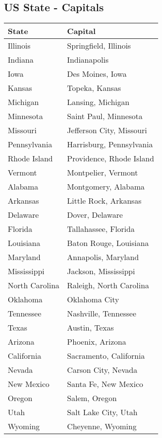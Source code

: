\documentclass[10pt,11pt,12pt,oneside]{book}
\begin{document}
\begin{appendices}
\subsection{US State - Capitals}
\begin{table}[H]
	\begin{center}
		\begin{tabular}{|p{3in}|p{3in}|} \hline 
			State & Capital \\ \hline 
			Illinois & Springfield, Illinois \\ \hline 
			Indiana & Indianapolis \\ \hline 
			Iowa & Des Moines, Iowa \\ \hline 
			Kansas & Topeka, Kansas \\ \hline 
			Michigan & Lansing, Michigan \\ \hline 
			Minnesota & Saint Paul, Minnesota \\ \hline 
			Missouri & Jefferson City, Missouri \\ \hline 
			Pennsylvania & Harrisburg, Pennsylvania \\ \hline 
			Rhode Island & Providence, Rhode Island \\ \hline 
			Vermont & Montpelier, Vermont \\ \hline 
			Alabama & Montgomery, Alabama \\ \hline 
			Arkansas & Little Rock, Arkansas \\ \hline 
			Delaware & Dover, Delaware \\ \hline 
			Florida & Tallahassee, Florida \\ \hline 
			Louisiana & Baton Rouge, Louisiana \\ \hline 
			Maryland & Annapolis, Maryland \\ \hline 
			Mississippi & Jackson, Mississippi \\ \hline 
			North Carolina & Raleigh, North Carolina \\ \hline 
			Oklahoma & Oklahoma City \\ \hline 
			Tennessee & Nashville, Tennessee \\ \hline 
			Texas & Austin, Texas \\ \hline 
			Arizona & Phoenix, Arizona \\ \hline 
			California & Sacramento, California \\ \hline 
			Nevada & Carson City, Nevada \\ \hline 
			New Mexico & Santa Fe, New Mexico \\ \hline 
			Oregon & Salem, Oregon \\ \hline 
			Utah & Salt Lake City, Utah \\ \hline 
			Wyoming & Cheyenne, Wyoming \\ \hline 
		\end{tabular}
	\end{center}
\end{table}


\end{appendices}
\end{document}
